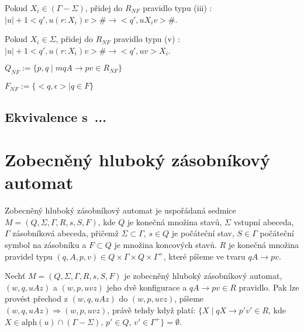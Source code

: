 \begin{Alg}
\begin{list}{}{\setlength\parsep{0cm} \setlength\itemsep{0cm} \setlength\leftmargin{1em}}
  \subsubitem Pokud $X_i \in (\Gamma - \Sigma)$, přidej do $R_{NF}$ pravidlo typu (iii) :
  \subsubitem $|u|+1 <q',u (r : X_i) v> \# \rightarrow <q',u X_i v> \# $. \medskip

  \subsubitem Pokud $X_i \in \Sigma$, přidej do $R_{NF}$ pravidlo typu (v) :
  \subsubitem $|u|+1 <q',u (r : X_i) v> \# \rightarrow <q',uv> X_i $. \bigskip

  \item $Q_{NF} := \{p,q \mid mqA \rightarrow pv \in R_{NF}\} $
  \item $F_{NF} := \{<q, \epsilon> \mid  q \in F \}$


\end{list}
\end{Alg}

\section{Ekvivalence s~...}

\chapter{Zobecněný hluboký zásobníkový automat}


\begin{Def}
Zobecněný hluboký zásobníkový automat je uspořádaná sedmice $M = (Q,\Sigma,\Gamma, R, s, S, F)$, 
kde $Q$ je konečná množina stavů, $\Sigma$ vstupní abeceda, $\Gamma$ zásobníková abeceda, přičemž $\Sigma \subset \Gamma$,
$s \in Q$ je počáteční stav, $S \in \Gamma$ počáteční symbol na zásobníku a $F \subset Q$ je množina
koncových stavů. $R$ je konečná množina pravidel typu $(q, A, p, v) \in Q \times \Gamma \times Q \times {\Gamma}^+$, které píšeme ve tvaru $qA \rightarrow pv$. 
\end{Def}

\begin{Def}
Nechť $M = (Q,\Sigma,\Gamma, R, s, S, F)$ je zobecněný hluboký zásobníkový automat, $(w,q,uAz)$ a $(w,p,uvz)$ jeho dvě konfigurace a $qA \rightarrow pv \in R$ pravidlo. Pak lze provést přechod z $(w,q,uAz)$ do $(w,p,uvz)$, píšeme $(w,q,uAz) {\Rightarrow} (w,p,uvz)$, právě tehdy když platí: $\{X \mid qX \rightarrow p'v' \in R$, kde $X \in \mathrm{alph}(u) \cap (\Gamma - \Sigma)$, $p' \in Q$, $v' \in {\Gamma}^+ \} = \emptyset$.
\end{Def}

